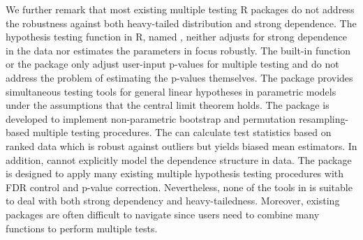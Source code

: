 



We further remark that most existing multiple testing R packages do not address the robustness against both heavy-tailed distribution and strong dependence.
The hypothesis testing function in R, named , neither adjusts for strong dependence in the data nor estimates the parameters in focus robustly. The built-in function  or the package  \citep{S2002} only adjust user-input p-values for multiple testing and do not address the problem of estimating the p-values themselves.
The package  \citep{multcomp} provides simultaneous testing tools for general linear hypotheses in parametric models under the assumptions that the central limit theorem holds.
The package  \citep{multtest} is developed to implement non-parametric bootstrap and permutation resampling-based multiple testing procedures. The  can calculate test statistics based on ranked data which is robust against outliers but yields biased mean estimators. In addition,  cannot explicitly model the dependence structure in data.
The package   is designed to apply many existing multiple hypothesis testing procedures with FDR control and p-value correction. Nevertheless, none of the tools in  is suitable to deal with both strong dependency and heavy-tailedness.
Moreover, existing packages are often difficult to navigate since users need to combine many functions to perform multiple tests.









